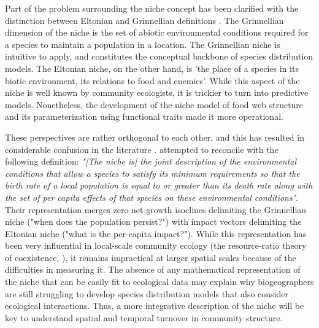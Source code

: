 \documentclass[12pt]{article}
\begin{document}
Part of the problem surrounding the niche concept has been clarified with the
distinction between Eltonian and Grinnellian definitions \citep{Chase2003}.
The Grinnellian dimension of the niche is the set of abiotic environmental conditions
required for a species to maintain a population in a location. The Grinnellian
niche is intuitive to apply, and constitutes the conceptual backbone of
species distribution models. The Eltonian niche, on the other hand, is 'the
place of a species in its biotic environment, its relations to food and
enemies'. While this aspect of the niche is well known by community
ecologists, it is trickier to turn into predictive models. Nonetheless, the
development of the niche model of food web structure \citep{Williams2000a} and
its parameterization using functional traits \citep{Gravel2013, Bartomeus2016}
made it more operational.

These perspectives are rather orthogonal to each other, and this has resulted
in considerable confusion in the literature \citep{McInerny2012a}.
\citealt{Chase2003} attempted to reconcile with the following definition:
\emph{"[The niche is] the joint description of the environmental conditions that
allow a species to satisfy its minimum requirements so that the birth rate of
a local population is equal to or greater than its death rate along with the
set of per capita effects of that species on these environmental conditions"}.
Their representation merges zero-net-growth isoclines delimiting the
Grinnellian niche ("when does the population persist?") with impact vectors
delimiting the Eltonian niche ("what is the per-capita impact?"). While this
representation has been very influential in local-scale community ecology (the
resource-ratio theory of coexistence, \citealt{Tilman1982}), it remains
impractical at larger spatial scales because of the difficulties in measuring
it. The absence of any mathematical representation of the niche that can be
easily fit to ecological data may explain why biogeographers are still
struggling to develop species distribution models that also consider
ecological interactions. Thus, a more integrative description of the niche
will be key to understand spatial and temporal turnover in community
structure.
\end{document}
